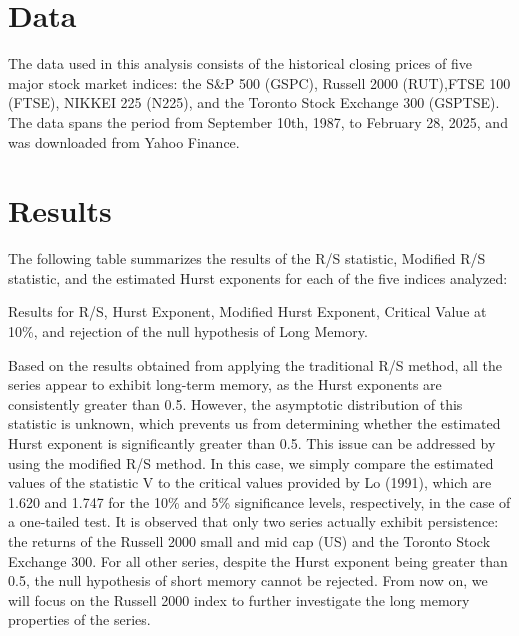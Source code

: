 \documentclass[11pt]{extarticle}
\begin{document}
\section{Data}

The data used in this analysis consists of the historical closing prices of five major stock market indices: the S\&P 500 (GSPC), Russell 2000 (RUT),FTSE 100 (FTSE), NIKKEI 225 (N225), and the Toronto Stock Exchange 300 (GSPTSE).
The data spans the period from September 10th, 1987, to February 28, 2025, and was downloaded from Yahoo Finance.

\section{Results}


The following table summarizes the results of the R/S statistic, Modified R/S statistic, and the estimated Hurst exponents for each of the five indices analyzed: \\

\begin{table}[h!]
    \centering
    \caption{Results for R/S, Hurst Exponent, Modified Hurst Exponent, Critical Value at 10\%, and rejection of the null
    hypothesis of Long Memory.}
    \label{tab:hurst_results}
\end{table}

\FloatBarrier


Based on the results obtained from applying the traditional R/S method, all the series appear to exhibit long-term memory,
as the Hurst exponents are consistently greater than 0.5. However, the asymptotic distribution of this statistic is unknown,
which prevents us from determining whether the estimated Hurst exponent is significantly greater than 0.5. This issue can be
addressed by using the modified R/S method. In this case, we simply compare the estimated values of the statistic V to the
critical values provided by Lo (1991), which are 1.620 and 1.747 for the 10\% and 5\% significance levels, respectively,
in the case of a one-tailed test. It is observed that only two series actually exhibit persistence: the returns of the
Russell 2000 small and mid cap (US) and the Toronto Stock Exchange 300.
For all other series, despite the Hurst exponent being greater than 0.5, the null hypothesis
of short memory cannot be rejected.
From now on, we will focus on the Russell 2000 index to further investigate the long memory properties of the series.
\end{document}
